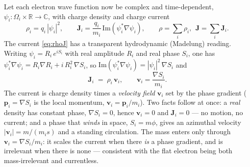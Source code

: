 \documentclass[11pt]{article}
\begin{document}
Let each electron wave function now be complex and time-dependent,
$\psi_i:\Omega_i\times\mathbb R\to\mathbb C$, with charge density and charge current
\begin{equation}
\rho_i = q_i\,|\psi_i|^2, \qquad
\mathbf J_i = \frac{q_i}{m_i}\,\mathrm{Im}\!\left(\psi_i^*\nabla\psi_i\right),
\qquad \rho=\sum_i\rho_i,\ \ \mathbf J=\sum_i\mathbf J_i .
\label{eq:rhoJ}
\end{equation}
The current \eqref{eq:rhoJ} has a transparent hydrodynamic (Madelung) reading. Writing
$\psi_i = R_i\,e^{iS_i}$ with real amplitude $R_i$ and real phase $S_i$, one has
$\psi_i^*\nabla\psi_i = R_i\nabla R_i + i\,R_i^2\,\nabla S_i$, so
$\mathrm{Im}(\psi_i^*\nabla\psi_i) = |\psi_i|^2\,\nabla S_i$ and
\begin{equation}
\mathbf J_i \;=\; \rho_i\,\mathbf v_i, \qquad \mathbf v_i = \frac{\nabla S_i}{m_i} .
\label{eq:madelung}
\end{equation}
The current is charge density times a \emph{velocity field} $\mathbf v_i$ set by the phase gradient
($\mathbf p_i = \nabla S_i$ is the local momentum, $\mathbf v_i = \mathbf p_i/m_i$). Two facts follow at
once: a \emph{real} density has constant phase, $\nabla S_i = 0$, hence $\mathbf v_i = 0$ and
$\mathbf J_i = 0$ --- no motion, no current; and a phase that \emph{winds} in space, $S_i = m\phi$, gives
an azimuthal velocity $|\mathbf v_i| = m/(m_i s)$ and a standing circulation. The mass enters only through
$\mathbf v_i = \nabla S_i/m_i$: it scales the current when there \emph{is} a phase gradient, and is
irrelevant when there is none --- consistent with the flat electron being both mass-irrelevant and
currentless.
\end{document}
